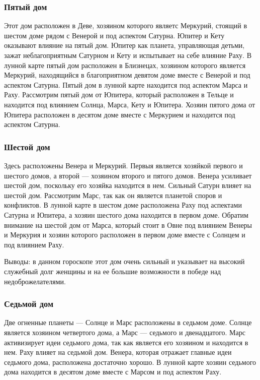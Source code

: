 \subsubsection*{Пятый дом}
Этот дом расположен в Деве, хозяином которого являетс Меркурий, стоящий в шестом доме рядом с Венерой и под аспектом Сатурна. Юпитер и Кету оказывают влияние на пятый дом. Юпитер как планета, управляющая детьми, зажат неблагоприятным Сатурном и Кету и испытывает на себе влияние Раху. В лунной карте пятый дом расположен в Близнецах, хозяином которого является Меркурий, находящийся в благоприятном девятом доме вместе с Венерой и под аспектом Сатурна. Пятый дом в лунной карте находится под аспектом Марса и Раху. Рассмотрим пятый дом от Юпитера, который расположен в Тельце и находится под влиянием Солнца, Марса, Кету и Юпитера. Хозяин пятого дома от Юпитера расположен в десятом доме вместе с Меркурием и находится под аспектом Сатурна.

\subsubsection*{Шестой дом}
Здесь расположены Венера и Меркурий. Первыя является хозяйкой первого и шестого домов, а второй --- хозяином второго и пятого домов. Венера усиливает шестой дом, поскольку его хозяйка находится в нем. Сильный Сатурн влияет на шестой дом. Рассмотрим Марс, так как он является планетой споров и конфликтов. В лунной карте в шестом доме расположена Раху под аспектами Сатурна и Юпитера, а хозяин шестого дома находится в первом доме. Обратим внимание на шестой дом от Марса, который стоит в Овне под влиянием Венеры и Меркурия и хозяин которого расположен в первом доме вместе с Солнцем и под влиянием Раху.

Выводы: в данном гороскопе этот дом очень сильный и указывает на высокий служебный долг женщины и на ее большие возможности в победе над недоброжелателями.

\subsubsection*{Седьмой дом}
Две огненные планеты --- Солнце и Марс расположены в седьмом доме. Солнце является хозяином четвертого дома, а Марс --- седьмого и двенадцатого. Марс активизирует идеи седьмого дома, так как является его хозяином и находится в нем. Раху влияет на седьмой дом. Венера, которая отражает главные идеи седьмого дома, расположена достаточно хорошо. В лунной карте хозяин седьмого дома находится в десятом доме вместе с Марсом и под аспектом Раху.

